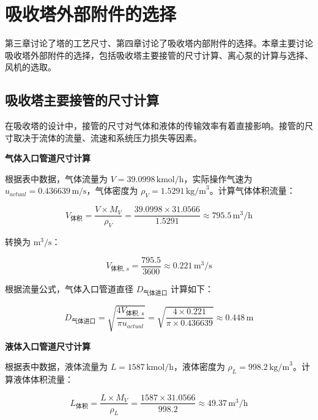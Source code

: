 \chapter{吸收塔外部附件的选择}

第三章讨论了塔的工艺尺寸、第四章讨论了吸收塔内部附件的选择。本章主要讨论吸收塔外部附件的选择，包括吸收塔主要接管的尺寸计算、离心泵的计算与选择、风机的选取。

\section{吸收塔主要接管的尺寸计算}

在吸收塔的设计中，接管的尺寸对气体和液体的传输效率有着直接影响。接管的尺寸取决于流体的流量、流速和系统压力损失等因素。

\textbf{气体入口管道尺寸计算}

根据表中数据，气体流量为 $V = 39.0998 \, \text{kmol/h}$，实际操作气速为 $u_{actual} = 0.436639 \, \text{m/s}$，气体密度为 $\rho_V = 1.5291 \, \text{kg/m}^3$。计算气体体积流量：

\begin{equation}
	V_{\text{体积}} = \frac{V \times M_V}{\rho_V} = \frac{39.0998 \times 31.0566}{1.5291} \approx 795.5 \, \text{m}^3/\text{h}
\end{equation}

转换为 $\text{m}^3/\text{s}$：

\begin{equation}
	V_{\text{体积, s}} = \frac{795.5}{3600} \approx 0.221 \, \text{m}^3/\text{s}
\end{equation}

根据流量公式，气体入口管道直径 $D_{\text{气体进口}}$ 计算如下：

\begin{equation}
	D_{\text{气体进口}} = \sqrt{\frac{4 V_{\text{体积, s}}}{\pi u_{actual}}} = \sqrt{\frac{4 \times 0.221}{\pi \times 0.436639}} \approx 0.448 \, \text{m}
\end{equation}

\textbf{液体入口管道尺寸计算}

根据表中数据，液体流量为 $L = 1587 \, \text{kmol/h}$，液体密度为 $\rho_L = 998.2 \, \text{kg/m}^3$。计算液体体积流量：

\begin{equation}
	L_{\text{体积}} = \frac{L \times M_V}{\rho_L} = \frac{1587 \times 31.0566}{998.2} \approx 49.37 \, \text{m}^3/\text{h}
\end{equation}

